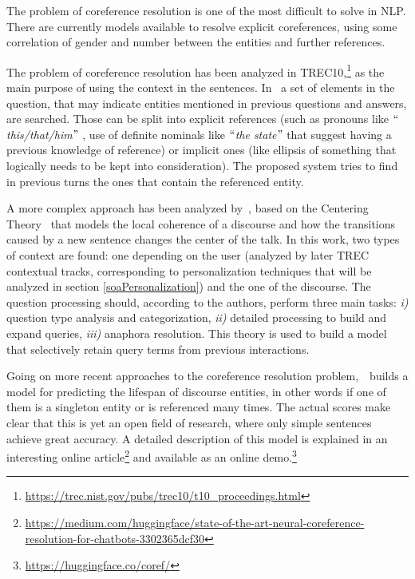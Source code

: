 The problem of coreference resolution is one of the most difficult to solve in NLP. There are currently models available to resolve explicit coreferences, using some correlation of gender and number between the entities and further references.

The problem of coreference resolution has been analyzed in TREC10,\footnote{\url{https://trec.nist.gov/pubs/trec10/t10\_proceedings.html}} as the main purpose of using the context in the sentences. In~\cite{harabagiu2001answering} a set of elements in the question, that may indicate entities mentioned in previous questions and answers, are searched. Those can be split into explicit references (such as pronouns like $``$\textit{this/that/him}$"$ , use of definite nominals like $``$\textit{the state}$"$  that suggest having a previous knowledge of reference) or implicit ones (like ellipsis of something that logically needs to be kept into consideration). The proposed system tries to find in previous turns the ones that contain the referenced entity.

A more complex approach has been analyzed by~\cite{sun2007discourse}, based on the Centering Theory~\cite{grosz1995centering} that models the local coherence of a discourse and how the transitions caused by a new sentence changes the center of the talk. In this work, two types of context are found: one depending on the user (analyzed by later TREC contextual tracks, corresponding to personalization techniques that will be analyzed in section \ref{soaPersonalization}) and the one of the discourse. The question processing should, according to the authors, perform three main tasks: \textit{i)} question type analysis and categorization, \textit{ii)} detailed processing to build and expand queries, \textit{iii)} anaphora resolution. This theory is used to build a model that selectively retain query terms from previous interactions.

Going on more recent approaches to the coreference resolution problem,~\cite{de2015modeling}\ builds a model  for predicting the lifespan of discourse entities, in other words if one of them is a singleton entity or is referenced many times. The actual scores make clear that this is yet an open field of research, where only simple sentences achieve great accuracy. A detailed description of this model is explained in an interesting online article\footnote{\url{https://medium.com/huggingface/state-of-the-art-neural-coreference-resolution-for-chatbots-3302365dcf30}} and available as an online demo.\footnote{\url{https://huggingface.co/coref/}}

